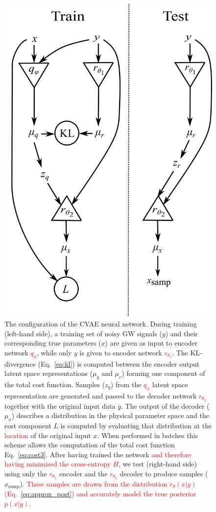 \documentclass[%
showpacs,
 amsmath,amssymb,
 aps,
 twocolumn,
 prl,
 reprint,
floatfix,
]{revtex4-1}
\newcommand{\new}[1]{\textcolor{red}{#1}}
\begin{document}
\begin{figure}
    \includegraphics[width=0.95\columnwidth]{network_setup.png}
    \caption{\label{fig:network_config} The configuration of the \ac{CVAE}
neural network. During training (left-hand side), a training set of noisy
\ac{GW} signals ($y$) and their corresponding true parameters ($x$) are given
as input to encoder network \new{$q_{\phi}$}, while only $y$ is given to
encoder network \new{$r_{\theta_1}$}. The \ac{KL}-divergence (Eq.~\ref{eq:kl})
is computed between the encoder output latent space representations
($\mu_q$ and $\mu_r$) forming one component of the total cost function. Samples
($z_q$) from the \new{$q_{\phi}$} latent space representation are generated and
passed to the decoder network \new{$r_{\theta_2}$} together with the original
input data $y$. The output of the decoder ($\mu_x$) describes a distribution in
the physical parameter space and the cost component $L$ is computed by
evaluating that distribution at the \new{location} of the original input $x$.
When performed in batches this scheme allows the computation of the total cost
function Eq.~\ref{eq:cost3}. After having trained the network \new{and
therefore having minimised the cross-entropy $H$}, we test (right-hand side)
using only the \new{$r_{\theta_1}$} encoder and the \new{$r_{\theta_2}$}
decoder to produce samples ($x_{\text{samp}}$). \new{These samples are drawn
from the distribution $r_{\theta}(x|y)$ (Eq.~\ref{eq:approx_post})
and accurately model the true posterior $p(x|y)$.}}
\end{figure}
\end{document}
